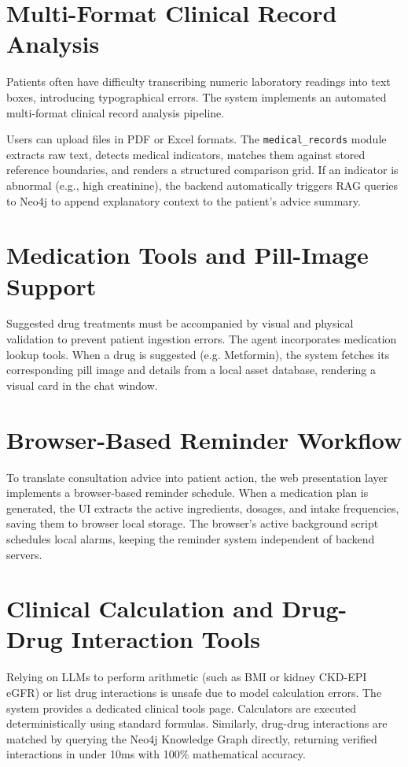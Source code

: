 \documentclass[../main.tex]{subfiles}
\begin{document}
\section{Multi-Format Clinical Record Analysis}
Patients often have difficulty transcribing numeric laboratory readings into text boxes, introducing typographical errors. The system implements an automated multi-format clinical record analysis pipeline.

Users can upload files in PDF or Excel formats. The \texttt{medical\_records} module extracts raw text, detects medical indicators, matches them against stored reference boundaries, and renders a structured comparison grid. If an indicator is abnormal (e.g., high creatinine), the backend automatically triggers RAG queries to Neo4j to append explanatory context to the patient's advice summary.

\section{Medication Tools and Pill-Image Support}
Suggested drug treatments must be accompanied by visual and physical validation to prevent patient ingestion errors. The agent incorporates medication lookup tools. When a drug is suggested (e.g. Metformin), the system fetches its corresponding pill image and details from a local asset database, rendering a visual card in the chat window.

\section{Browser-Based Reminder Workflow}
To translate consultation advice into patient action, the web presentation layer implements a browser-based reminder schedule. When a medication plan is generated, the UI extracts the active ingredients, dosages, and intake frequencies, saving them to browser local storage. The browser's active background script schedules local alarms, keeping the reminder system independent of backend servers.

\section{Clinical Calculation and Drug-Drug Interaction Tools}
Relying on LLMs to perform arithmetic (such as BMI or kidney CKD-EPI eGFR) or list drug interactions is unsafe due to model calculation errors. The system provides a dedicated clinical tools page. Calculators are executed deterministically using standard formulas. Similarly, drug-drug interactions are matched by querying the Neo4j Knowledge Graph directly, returning verified interactions in under 10ms with 100\% mathematical accuracy.
\end{document}
